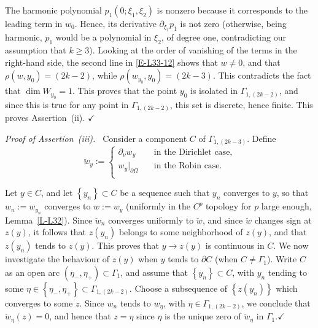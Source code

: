 \documentclass[12pt,a4paper]{amsart}
\theoremstyle{plain} %
\theoremstyle{definition}
\numberwithin{equation}{section}
\numberwithin{figure}{section}
\numberwithin{table}{section}
\newcommand{\qedc}{$\checkmark$}
\newcommand{\set}[1]{\left\lbrace #1 \right\rbrace}
\begin{document}
 The harmonic polynomial $p_1(0;\xi_1,\xi_2)$ is nonzero because it corresponds to the leading term in $w_0$. Hence, its derivative $\partial_{\xi_1}p_1$ is not zero  (otherwise, being harmonic, $p_1$ would be a polynomial in $\xi_2$, of degree one, contradicting our assumption that $k \ge 3$).  Looking at the order of vanishing of the terms in the right-hand side, the second line in \eqref{E-L33-12} shows that $w \neq 0$, and that $\rho(w,y_0) = (2k-2)$, while $\rho(w_{y_0},y_0) = (2k-3)$. This contradicts the fact that $\dim W_{y_0} = 1$. This proves that the point $y_0$ is isolated in $\Gamma_{1,(2k-2)}$, and since this is true for any point in $\Gamma_{1,(2k-2)}$, this set is discrete, hence finite. This proves Assertion~(ii). \hfill \qedc \smallskip

\emph{Proof of Assertion~(iii).~} Consider a component $C$ of $\Gamma_{1,(2k -3)}$. Define
%
\begin{equation}\label{E-bha4-3e}
\breve{w}_y := \left\{
\begin{array}{ll}
\partial_{\nu}w_y &\quad \text{in the Dirichlet case,}\\[5pt]
w_y|_{\partial \Omega} &\quad \text{in the Robin case.}\\[5pt]
\end{array}
\right.
\end{equation}

Let $y \in C$, and let $\set{y_n} \subset C$ be a sequence such that $y_n$ converges to $y$, so that $w_n := w_{y_n}$ converges to $w:=w_y$ (uniformly in the $C^p$ topology for $p$ large enough, Lemma~\ref{L-L32}).
Since $\breve{w}_n$ converges uniformly to $\breve{w}$, and since $\breve{w}$ changes sign at $z(y)$, it follows that $z(y_n)$ belongs to some neighborhood of $z(y)$, and that $z(y_n)$ tends to $z(y)$.
 This proves that $y \to z(y)$ is continuous in $C$. We now investigate the behaviour of $z(y)$ when $y$ tends to $\partial C$ (when $C \neq \Gamma_1$). Write $C$ as an open arc $(\eta_{-},\eta_{+}) \subset \Gamma_1$,
 and assume that $\set{y_n} \subset C$, with $y_n$ tending to some $\eta \in \set{\eta_{-},\eta_{+}} \subset \Gamma_{1,(2k-2)}$.
  Choose a subsequence of $\set{z(y_n)}$ which converges to some $z$. Since $w_n$ tends to $w_{\eta}$, with $\eta \in \Gamma_{1,(2k -2)}$,
   we conclude that $\breve{w}_{\eta}(z) = 0$, and hence that $z=\eta$ since $\eta$ is the unique zero of $\breve{w}_{\eta}$ in $\Gamma_1$.\hfill \qedc\medskip
\end{document}
